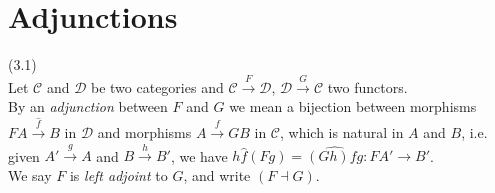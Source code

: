 \documentclass[a4paper]{article}
\begin{document}
\newpage

\section{Adjunctions}
\begin{defi} (3.1)\\
    Let $\mathcal{C}$ and $\mathcal{D}$ be two categories and $\mathcal{C} \xrightarrow{F} \mathcal{D}$, $\mathcal{D} \xrightarrow{G} \mathcal{C}$ two functors.\\
    By an \emph{adjunction} between $F$ and $G$ we mean a bijection between morphisms $FA \xrightarrow{\hat{f}} B$ in $\mathcal{D}$ and morphisms $A \xrightarrow{f} GB$ in $\mathcal{C}$, which is natural in $A$ and $B$, i.e. given $A' \xrightarrow{g} A$ and $B \xrightarrow{h} B'$, we have $h\hat{f} (Fg) = \widehat{(Gh)fg}: FA' \to B'$.\\
    We say $F$ is \emph{left adjoint} to $G$, and write $(F \dashv G)$.
\end{defi}
\end{document}
